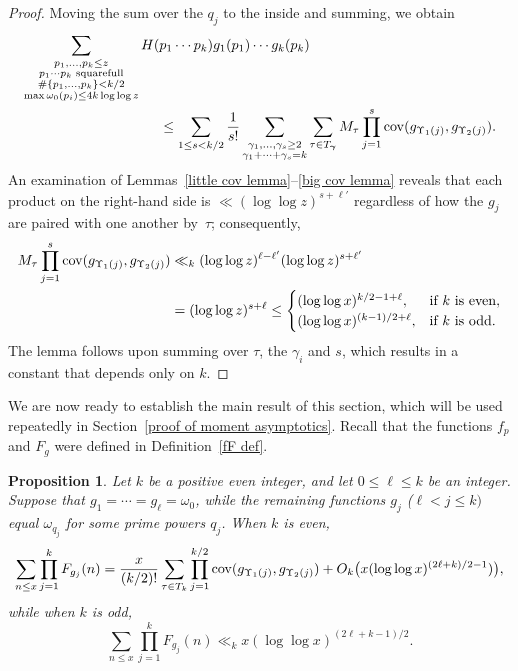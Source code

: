 \documentclass[12pt,reqno]{amsart}
\newtheorem{prop}[theorem]{Proposition}
\theoremstyle{definition}
\newcommand{\cov}{\mathop{\rm cov}\nolimits}
\newcommand{\bgamma}{{\bm\gamma}}
\begin{document}
\begin{proof}
Moving the sum over the $q_j$ to the inside and summing, we obtain
\begin{align*}
\sum_{\substack{p_1,\dots,p_k \leq z \\ p_1\cdots p_k \text{ squarefull} \\ \#\{p_1,\dots,p_k\} < k/2 \\ \max \omega_0(p_i) \le 4k\log\log z}} H( & p_1\cdots p_k) g_1(p_1) \cdots g_k(p_k) \\
&\le \sum_{1\le s<k/2} \frac{1}{s!} \sum_{\substack{\gamma_1,\dots,\gamma_s\ge2 \\ \gamma_1+\cdots+\gamma_s=k}} \sum_{\tau\in T_\bgamma} M_\tau \prod_{j=1}^s \cov(g_{\Upsilon_1(j)},g_{\Upsilon_2(j)}).
\end{align*}
An examination of Lemmas~\ref{little cov lemma}--\ref{big cov lemma} reveals that each product on the right-hand side is $\ll (\log\log z)^{s + \ell'}$ regardless of how the $g_j$ are paired with one another by~$\tau$; consequently,
\begin{align*}
M_\tau \prod_{j=1}^s \cov(g_{\Upsilon_1(j)},g_{\Upsilon_2(j)}) &\ll_k (\log\log z)^{\ell - \ell'}(\log\log z)^{s + \ell'} \\
&= (\log\log z)^{s + \ell} \le \begin{cases}
(\log\log x)^{k/2 - 1 + \ell}, &\text{if $k$ is even}, \\
(\log\log x)^{(k-1)/2 + \ell}, &\text{if $k$ is odd}.
\end{cases}
\end{align*}
The lemma follows upon summing over $\tau$, the $\gamma_i$ and $s$, which results in a constant that depends only on $k$.
\end{proof}

We are now ready to establish the main result of this section, which will be used repeatedly in Section~\ref{proof of moment asymptotics}. Recall that the functions $f_p$ and $F_g$ were defined in Definition~\ref{fF def}.

\begin{prop}  \label{summing products of k Fs}
Let $k$ be a positive even integer, and let $0\le\ell\le k$ be an integer. Suppose that $g_1=\cdots=g_\ell=\omega_0$, while the remaining functions $g_j$ ($\ell<j\le k)$ equal $\omega_{q_j}$ for some prime powers $q_j$. When $k$ is even,
\[
\sum_{n \leq x} \prod_{j=1}^k F_{g_j}(n) = \frac x{(k/2)!} \sum_{\tau\in T_k} \prod_{j=1}^{k/2} \cov(g_{\Upsilon_1(j)},g_{\Upsilon_2(j)}) + O_k\big( x(\log\log x)^{(2\ell + k)/2 - 1})\big),
\]
while when $k$ is odd,
\[
\sum_{n \leq x} \prod_{j=1}^k F_{g_j}(n) \ll_k x (\log\log x)^{(2\ell + k - 1)/2}.
\]
\end{prop}
\end{document}
